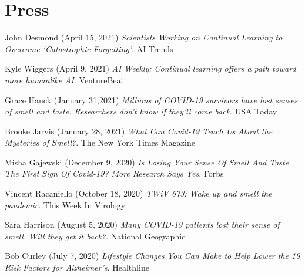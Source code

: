 \documentclass[10pt]{cooperCV2}
\begin{document}
%	






\section{Press}

 
\begin{etaremune}[itemindent=-1.5\bibhang, topsep=0pt,
				   itemsep=\bibsep,partopsep=0pt,parsep=0pt,leftmargin={\bibhang+\widthof{[999]}}] 
    
    
    \item John Desmond (April 15, 2021) \textit{Scientists Working on Continual Learning to Overcome ‘Catastrophic Forgetting’}. AI Trends
     
	
    \item Kyle Wiggers (April 9, 2021) \textit{AI Weekly: Continual learning offers a path toward more humanlike AI}. VentureBeat
     
	
    \item Grace Hauck (January 31,2021) \textit{Millions of COVID-19 survivors have lost senses of smell and taste. Researchers don't know if they'll come back}. USA Today
     
	
    \item Brooke Jarvis (January 28, 2021) \textit{What Can Covid-19 Teach Us About the Mysteries of Smell?}. The New York Times Magazine
     
	
    \item Misha Gajewski (December 9, 2020) \textit{Is Losing Your Sense Of Smell And Taste The First Sign Of Covid-19? More Research Says Yes}. Forbs
     
	
    \item Vincent Racaniello (October 18, 2020) \textit{TWiV 673: Wake up and smell the pandemic}. This Week In Virology
     
	
    \item Sara Harrison (August 5, 2020) \textit{Many COVID-19 patients lost their sense of smell. Will they get it back?}. National Geographic
     
	
    \item Bob Curley (July 7, 2020) \textit{Lifestyle Changes You Can Make to Help Lower the 19 Risk Factors for Alzheimer’s}. Healthline
     

\end{etaremune}
\end{document}
